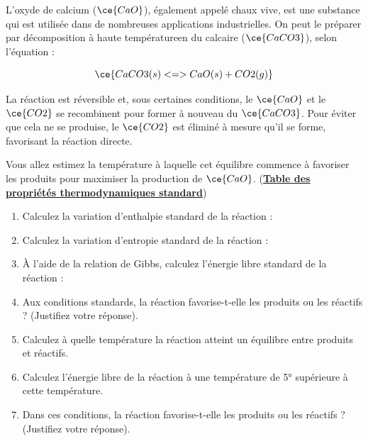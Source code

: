 \documentclass[
  11pt,
  a4paper,
  openany]{book}
\providecommand{\tightlist}{%
  \setlength{\itemsep}{0pt}\setlength{\parskip}{0pt}}
\begin{document}
\begin{Exercise}

L'oxyde de calcium (\(\ce{CaO}\)), également appelé chaux vive, est une substance qui est utilisée dans de nombreuses applications industrielles. On peut le préparer par décomposition à haute températureen du calcaire (\(\ce{CaCO3}\)), selon l'équation :

\[ \ce{CaCO3(s) <=> CaO(s) + CO2(g)} \]

La réaction est réversible et, sous certaines conditions, le \(\ce{CaO}\) et le \(\ce{CO2}\) se recombinent pour former à nouveau du \(\ce{CaCO3}\). Pour éviter que cela ne se produise, le \(\ce{CO2}\) est éliminé à mesure qu'il se forme, favorisant la réaction directe.

Vous allez estimez la température à laquelle cet équilibre commence à favoriser les produits pour maximiser la production de \(\ce{CaO}\). (\href{https://bit.ly/GNLC-TPTS}{\textbf{Table des propriétés thermodynamiques standard}})

\begin{enumerate}
\def\labelenumi{\arabic{enumi}.}
\tightlist
\item
  Calculez la variation d'enthalpie standard de la réaction : 
\item
  Calculez la variation d'entropie standard de la réaction : 
\item
  À l'aide de la relation de Gibbs, calculez l'énergie libre standard de la réaction : 
\item
  Aux conditions standards, la réaction favorise-t-elle les produits ou les réactifs ? (Justifiez votre réponse). 
\item
  Calculez à quelle température la réaction atteint un équilibre entre produits et réactifs. 
\item
  Calculez l'énergie libre de la réaction à une température de 5° supérieure à cette température. 
\item
  Dans ces conditions, la réaction favorise-t-elle les produits ou les réactifs ? (Justifiez votre réponse). 
\end{enumerate}

\end{Exercise}
\end{document}
